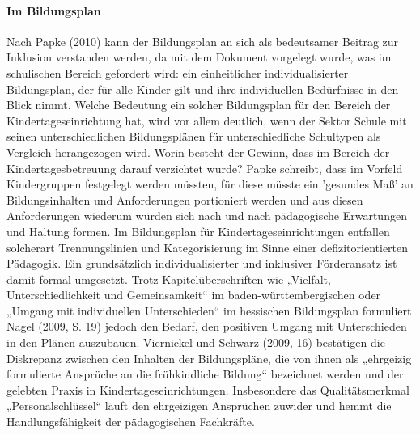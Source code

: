 \paragraph{Im Bildungsplan}
Nach Papke (2010) kann der Bildungsplan an sich als bedeutsamer Beitrag zur Inklusion verstanden werden, da mit dem Dokument vorgelegt wurde, was im schulischen Bereich gefordert wird: ein einheitlicher individualisierter Bildungsplan, der für alle Kinder gilt und ihre individuellen Bedürfnisse in den Blick nimmt. Welche Bedeutung ein solcher Bildungsplan für den Bereich der Kindertageseinrichtung hat, wird vor allem deutlich, wenn der Sektor Schule mit seinen unterschiedlichen Bildungsplänen für unterschiedliche Schultypen als Vergleich herangezogen wird. Worin besteht der Gewinn, dass im Bereich der Kindertagesbetreuung darauf verzichtet wurde? Papke schreibt, dass im Vorfeld Kindergruppen festgelegt werden müssten, für diese müsste ein 'gesundes Maß' an Bildungsinhalten und Anforderungen portioniert werden und aus diesen Anforderungen wiederum würden sich nach und nach pädagogische Erwartungen und Haltung formen. Im Bildungsplan für Kindertageseinrichtungen entfallen solcherart Trennungslinien und Kategorisierung im Sinne einer defizitorientierten Pädagogik. Ein grundsätzlich individualisierter und inklusiver Förderansatz ist damit formal umgesetzt. Trotz Kapitelüberschriften wie „Vielfalt, Unterschiedlichkeit und Gemeinsamkeit“ im baden-württembergischen oder „Umgang mit individuellen Unterschieden“ im hessischen Bildungsplan formuliert Nagel (2009, S. 19) jedoch den Bedarf, den positiven Umgang mit Unterschieden in den Plänen auszubauen. Viernickel und Schwarz (2009, 16) bestätigen die Diskrepanz zwischen den Inhalten der Bildungspläne, die von ihnen als „ehrgeizig formulierte Ansprüche an die frühkindliche Bildung“ bezeichnet werden und der gelebten Praxis in Kindertageseinrichtungen. Insbesondere das Qualitätsmerkmal „Personalschlüssel“ läuft den ehrgeizigen Ansprüchen zuwider und hemmt die Handlungsfähigkeit der pädagogischen Fachkräfte.

